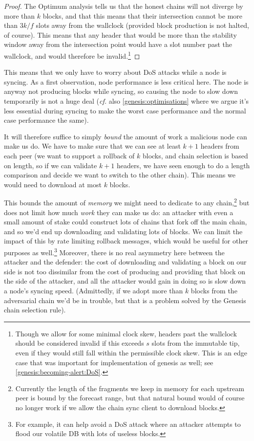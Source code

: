 \begin{proof}
The Optimum analysis \cite{cryptoeprint:2017:573} tells us that the honest chains
will not diverge by more than $k$ blocks, and that this means that their
intersection cannot be more than $3k/f$ slots away from the wallclock (provided
block production is not halted, of course). This means that any header that
would be more than the stability window away from the intersection point
would have a slot number past the wallclock, and would therefore be
invalid.\footnote{Though we allow for some minimal clock skew, headers past
the wallclock should be considered invalid if this exceeds $s$ slots from the
immutable tip, even if they would still fall within the permissible clock
skew. This is an edge case that was important for implementation of genesis
as well; see \cref{genesis:becoming-alert:DoS}.}
\end{proof}

This means that we only have to worry about DoS attacks while a node is syncing.
As a first observation, node performance is less critical here. The node is
anyway not producing blocks while syncing, so causing the node to slow down
temporarily is not a huge deal (\emph{cf.} also \cref{genesis:optimisations}
where we argue it's less essential during syncing to make the worst case
performance and the normal case performance the same).

It will therefore suffice to simply \emph{bound} the amount of work a malicious
node can make us do. We have to make sure that we can see at least $k+1$ headers
from each peer (we want to support a rollback of $k$ blocks, and chain selection
is based on length, so if we can validate $k+1$ headers, we have seen enough to
do a length comparison and decide we want to switch to the other chain). This
means we would need to download at most $k$ blocks.

This bounds the amount of \emph{memory} we might need to dedicate to any
chain,\footnote{Currently the length of the fragments we keep in memory for each
upstream peer is bound by the forecast range, but that natural bound would of
course no longer work if we allow the chain sync client to download blocks.} but
does not limit how much \emph{work} they can make us do: an attacker with even a
small amount of stake could construct lots of chains that fork off the main
chain, and so we'd end up downloading and validating lots of blocks. We can
limit the impact of this by rate limiting rollback messages, which would be
useful for other purposes as well.\footnote{For example, it can help avoid a DoS
attack where an attacker attempts to flood our volatile DB with lots of useless
blocks.}  Moreover, there is no real asymmetry here between the attacker and the
defender: the cost of downloading and validating a block on our side is  not too
dissimilar from the cost of producing and providing that block on the side of
the attacker, and all the attacker would gain in doing so is slow down a node's
syncing speed. (Admittedly, if we adopt more than $k$ blocks from the
adversarial chain we'd be in trouble, but that is a problem solved by the
Genesis chain selection rule).

